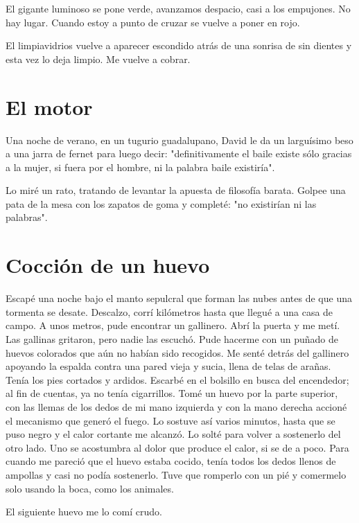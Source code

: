\documentclass[11pt,twoside,openright,a6paper]{book}
\begin{document}
El gigante luminoso se pone verde, avanzamos despacio, casi a los empujones. No hay lugar. Cuando estoy a punto de cruzar se vuelve a poner en rojo.

El limpiavidrios vuelve a aparecer escondido atrás de una sonrisa de sin dientes y esta vez lo deja limpio.
Me vuelve a cobrar.

\chapter*{El motor}

Una noche de verano, en un tugurio guadalupano, David le da un larguísimo beso a una jarra de fernet para luego decir: "definitivamente el baile existe sólo gracias a la mujer, si fuera por el hombre, ni la palabra baile existiría".

Lo miré un rato, tratando de levantar la apuesta de filosofía barata. Golpee una pata de la mesa con los zapatos de goma y completé: "no existirían ni las palabras".

\chapter*{Cocción de un huevo}

Escapé una noche bajo el manto sepulcral que forman las nubes antes de que una tormenta se desate. Descalzo, corrí kilómetros hasta que llegué a una casa de campo. A unos metros, pude encontrar un gallinero. Abrí la puerta y me metí. Las gallinas gritaron, pero nadie las escuchó. Pude hacerme con un puñado de huevos colorados que aún no habían sido recogidos. Me senté detrás del gallinero apoyando la espalda contra una pared vieja y sucia, llena de telas de arañas. Tenía los pies cortados y ardidos. Escarbé en el bolsillo en busca del encendedor; al fin de cuentas, ya no tenía cigarrillos. Tomé un huevo por la parte superior, con las llemas de los dedos de mi mano izquierda y con la mano derecha accioné el mecanismo que generó el fuego. Lo sostuve así varios minutos, hasta que se puso negro y el calor cortante me alcanzó. Lo solté para volver a sostenerlo del otro lado. Uno se acostumbra al dolor que produce el calor, si se de a poco. Para cuando me pareció que el huevo estaba cocido, tenía todos los dedos llenos de ampollas y casi no podía sostenerlo. Tuve que romperlo con un pié y comermelo solo usando la boca, como los animales.

El siguiente huevo me lo comí crudo.
\end{document}
